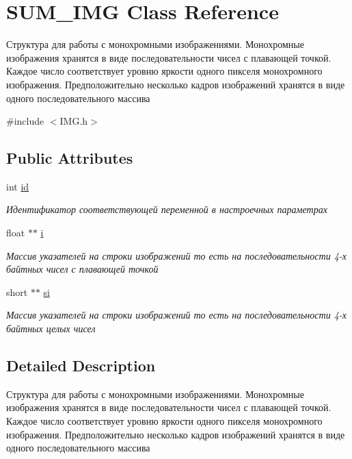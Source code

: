 \hypertarget{class_s_u_m___i_m_g}{\section{S\+U\+M\+\_\+\+I\+M\+G Class Reference}
\label{class_s_u_m___i_m_g}
}


Структура для работы с монохромными изображениями. Монохромные изображения хранятся в виде последовательности чисел с плавающей точкой. Каждое число соответствует уровню яркости одного пикселя монохромного изображения. Предположительно несколько кадров изображений хранятся в виде одного последовательного массива  




{\ttfamily \#include $<$I\+M\+G.\+h$>$}

\subsection*{Public Attributes}
\begin{DoxyCompactItemize}
\item 
int \hyperlink{class_s_u_m___i_m_g_a42cfef194bb1fe08e164e015ad3e6d69}{id}
\begin{DoxyCompactList}\small\item\em Идентификатор соответствующей переменной в настроечных параметрах \end{DoxyCompactList}\item 
float $\ast$$\ast$ \hyperlink{class_s_u_m___i_m_g_ac3c585d2cf35e0e9736a19daef633e02}{i}
\begin{DoxyCompactList}\small\item\em Массив указателей на строки изображений то есть на последовательности 4-\/х байтных чисел с плавающей точкой \end{DoxyCompactList}\item 
short $\ast$$\ast$ \hyperlink{class_s_u_m___i_m_g_a3da86ff936709e9963e6b0a87406afe1}{si}
\begin{DoxyCompactList}\small\item\em Массив указателей на строки изображений то есть на последовательности 4-\/х байтных целых чисел \end{DoxyCompactList}\end{DoxyCompactItemize}


\subsection{Detailed Description}
Структура для работы с монохромными изображениями. Монохромные изображения хранятся в виде последовательности чисел с плавающей точкой. Каждое число соответствует уровню яркости одного пикселя монохромного изображения. Предположительно несколько кадров изображений хранятся в виде одного последовательного массива 



